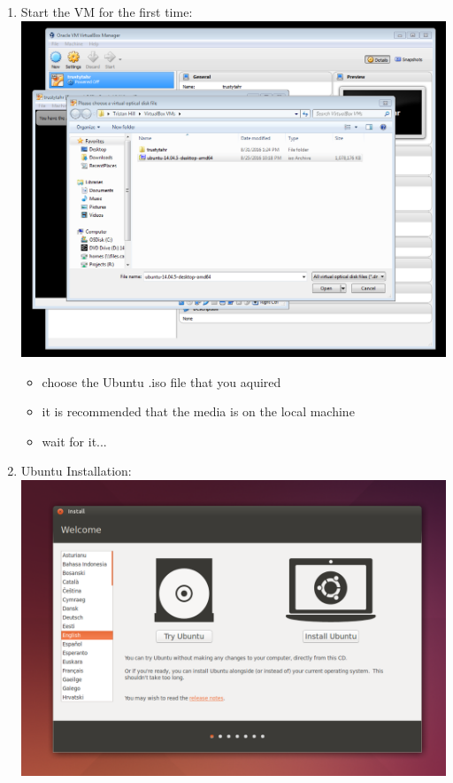 \documentclass[12pt]{article}
\begin{document}
\begin{description}
\begin{enumerate}
\item Start the VM for the first time: \vspace{20mm} \\
      		\includegraphics[scale=.6]{Capture9.png} \\
               \begin{itemize}
                    
     
                \item choose the Ubuntu .iso file that you aquired
                \item it is recommended that the media is on the local machine
                \item wait for it...
                
            \end{itemize}


        
	\newpage
\item Ubuntu Installation: \vspace{20mm} \\
      		\includegraphics[scale=.6]{Capture10.png}
            \begin{itemize}
                    

\end{itemize}
\end{enumerate}
\end{description}
\end{document}
